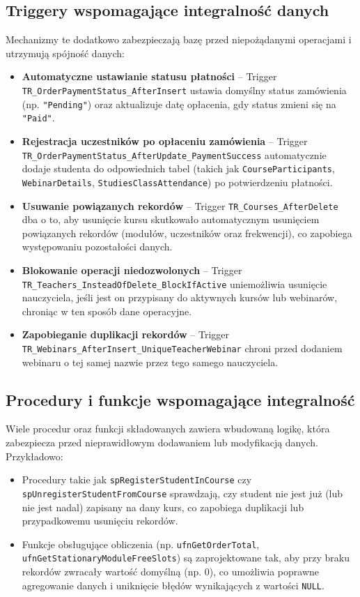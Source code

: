 \documentclass[12pt]{article}
\begin{document}
\subsection{Triggery wspomagające integralność danych}
Mechanizmy te dodatkowo zabezpieczają bazę przed niepożądanymi operacjami i utrzymują spójność danych:
\begin{itemize}
    \item \textbf{Automatyczne ustawianie statusu płatności} – Trigger \texttt{TR\_OrderPaymentStatus\_AfterInsert} ustawia domyślny status zamówienia (np. \texttt{"Pending"}) oraz aktualizuje datę opłacenia, gdy status zmieni się na \texttt{"Paid"}.
    \item \textbf{Rejestracja uczestników po opłaceniu zamówienia} – Trigger \texttt{TR\_OrderPaymentStatus\_AfterUpdate\_PaymentSuccess} automatycznie dodaje studenta do odpowiednich tabel (takich jak \texttt{CourseParticipants}, \texttt{WebinarDetails}, \texttt{StudiesClassAttendance}) po potwierdzeniu płatności.
    \item \textbf{Usuwanie powiązanych rekordów} – Trigger \texttt{TR\_Courses\_AfterDelete} dba o to, aby usunięcie kursu skutkowało automatycznym usunięciem powiązanych rekordów (modułów, uczestników oraz frekwencji), co zapobiega występowaniu pozostałości danych.
    \item \textbf{Blokowanie operacji niedozwolonych} – Trigger \texttt{TR\_Teachers\_InsteadOfDelete\_BlockIfActive} uniemożliwia usunięcie nauczyciela, jeśli jest on przypisany do aktywnych kursów lub webinarów, chroniąc w ten sposób dane operacyjne.
    \item \textbf{Zapobieganie duplikacji rekordów} – Trigger \texttt{TR\_Webinars\_AfterInsert\_UniqueTeacherWebinar} chroni przed dodaniem webinaru o tej samej nazwie przez tego samego nauczyciela.
\end{itemize}

\subsection{Procedury i funkcje wspomagające integralność}
Wiele procedur oraz funkcji składowanych zawiera wbudowaną logikę, która zabezpiecza przed nieprawidłowym dodawaniem lub modyfikacją danych. Przykładowo:
\begin{itemize}
    \item Procedury takie jak \texttt{spRegisterStudentInCourse} czy \texttt{spUnregisterStudentFromCourse} sprawdzają, czy student nie jest już (lub nie jest nadal) zapisany na dany kurs, co zapobiega duplikacji lub przypadkowemu usunięciu rekordów.
    \item Funkcje obsługujące obliczenia (np. \texttt{ufnGetOrderTotal}, \texttt{ufnGetStationaryModuleFreeSlots}) są zaprojektowane tak, aby przy braku rekordów zwracały wartość domyślną (np. 0), co umożliwia poprawne agregowanie danych i uniknięcie błędów wynikających z wartości \texttt{NULL}.
\end{itemize}
\end{document}
